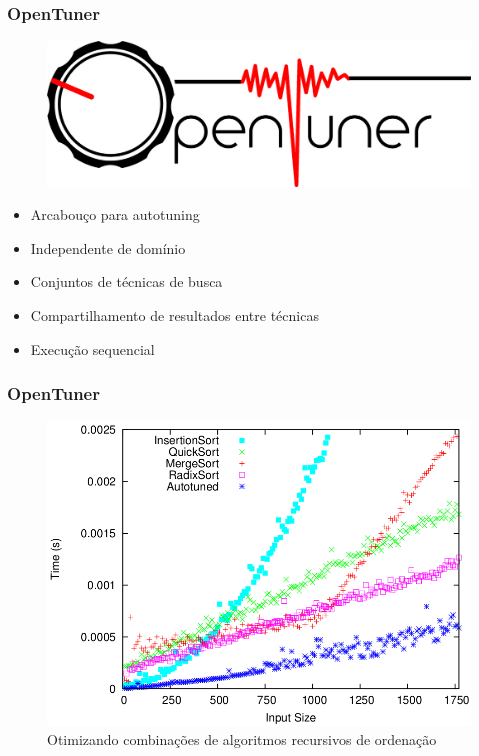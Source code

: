 \documentclass[10pt, compress]{beamer}
\begin{document}
\begin{frame}[fragile]
    \frametitle{OpenTuner}
    \begin{figure}[H]
        \centering
        \includegraphics[width=.34\textwidth]{opentuner-logo}
    \end{figure}%
    \begin{itemize}
        \item \alert{Arcabouço} para autotuning
        \item \alert{Independente} de domínio
            \pause
        \item \alert{Conjuntos} de técnicas de busca
        \item \alert{Compartilhamento} de resultados entre técnicas
            \pause
        \item Execução \alert{sequencial}
    \end{itemize}
    \let\thefootnote\relax{}
\end{frame}

\begin{frame}[fragile]
    \frametitle{OpenTuner}
    \begin{figure}[H]
        \centering
        \includegraphics[width=.8\textwidth]{sorting}
        \caption{Otimizando combinações de algoritmos recursivos de ordenação}
    \end{figure}%
    \let\thefootnote\relax{}
\end{frame}
\end{document}
